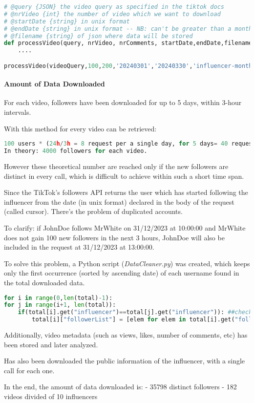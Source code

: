 \begin{lstlisting}[language=Python]
# @query {JSON} the video query as specified in the tiktok docs
# @nrVideo {int} the number of video which we want to download
# @startDate {string} in unix format
# @endDate {string} in unix format -- NB: can't be greater than a month
# @filename {string} of json where data will be stored
def processVideo(query, nrVideo, nrComments, startDate,endDate,filename):
    ....

processVideo(videoQuery,100,200,'20240301','20240330','influencer-month')
\end{lstlisting}

\paragraph*{Amount of Data Downloaded}

For each video, followers have been downloaded for up to 5 days, within 3-hour intervals.

With this method for every video can be retrieved:

\begin{lstlisting}[language=Python]
100 users * (24h/3h = 8 request per a single day, for 5 days= 40 request)
In theory: 4000 followers for each video.
\end{lstlisting}

However these theoretical number are reached only if the new followers are distinct in every call, which is difficult to achieve within such a short time span.

Since the TikTok's followers API returns the user which has started following the influencer from the date (in unix format) declared in the body of the request (called cursor). There's the problem of duplicated accounts.

To clarify: if JohnDoe follows MrWhite on 31/12/2023 at 10:00:00 and MrWhite does not gain 100 new followers in the next 3 hours, JohnDoe will also be included in the request at 31/12/2023 at 13:00:00.

To solve this problem, a Python script (\textit{DataCleaner.py}) was created, which keeps only the first occurrence (sorted by ascending date) of each username found in the total downloaded data.

\begin{lstlisting}[language=Python]
for i in range(0,len(total)-1):
for j in range(i+1, len(total)):
    if(total[i].get("influencer")==total[j].get("influencer")): ##check if the same influencer (we don't want to remove common followers)
        total[i]["followerList"] = [elem for elem in total[i].get("followerList") if elem not in total[j].get("followerList")]
\end{lstlisting}

Additionally, video metadata (such as views, likes, number of comments, etc) has been stored and later analyzed.

Has also been downloaded the public information of the influencer, with a single call for each one.

In the end, the amount of data downloaded is:
- 35798 distinct followers
- 182 videos divided of 10 influencers